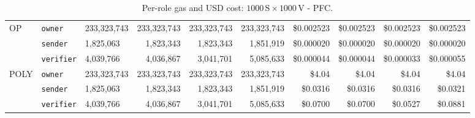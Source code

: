 \begin{table}
{\begin{tabular}{|ll |lrrr| rrrr|}
            \hline
            \multirow{3}{*}{OP}   & \texttt{owner}    & 233,323,743 & 233,323,743 & 233,323,743 & 233,323,743 & \$0.002523 & \$0.002523 & \$0.002523 & \$0.002523 \\
            & \texttt{sender}   & 1,825,063   & 1,823,343   & 1,823,343   & 1,851,919   & \$0.000020 & \$0.000020 & \$0.000020 & \$0.000020 \\
            & \texttt{verifier} & 4,039,766   & 4,036,867   & 3,041,701   & 5,085,633   & \$0.000044 & \$0.000044 & \$0.000033 & \$0.000055 \\
            \hline
            \multirow{3}{*}{POLY} & \texttt{owner}    & 233,323,743 & 233,323,743 & 233,323,743 & 233,323,743 & \$4.04     & \$4.04     & \$4.04     & \$4.04     \\
            & \texttt{sender}   & 1,825,063   & 1,823,343   & 1,823,343   & 1,851,919   & \$0.0316   & \$0.0316   & \$0.0316   & \$0.0321   \\
            & \texttt{verifier} & 4,039,766   & 4,036,867   & 3,041,701   & 5,085,633   & \$0.0700   & \$0.0700   & \$0.0527   & \$0.0881   \\
            \hline
        \end{tabular}%
    }
    \caption{Per-role gas and USD cost: $1000\,\text{S} \times 1000\,\text{V}$ - PFC.}
    \label{tab:proto-evaluation-merged-pfc}
\end{table}

